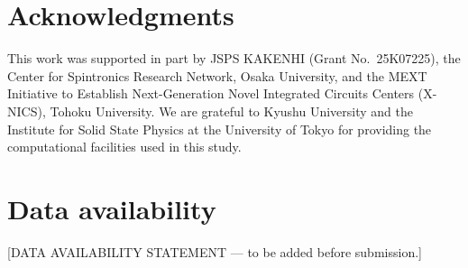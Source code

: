 
\section*{Acknowledgments}\label{sec:ack}

This work was supported in part by JSPS KAKENHI (Grant No.~25K07225), the
Center for Spintronics Research Network, Osaka University, and the MEXT
Initiative to Establish Next-Generation Novel Integrated Circuits Centers
(X-NICS), Tohoku University. We are grateful to Kyushu University and the
Institute for Solid State Physics at the University of Tokyo for providing
the computational facilities used in this study.

\section*{Data availability}\label{sec:dataavail}

[DATA AVAILABILITY STATEMENT — to be added before submission.]
